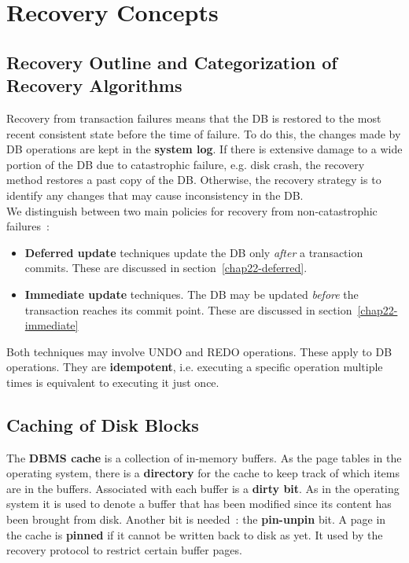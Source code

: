 \section{Recovery Concepts}

\subsection{Recovery Outline and Categorization of Recovery Algorithms}

Recovery from transaction failures means that the DB is restored to the most recent consistent state before the time of failure. To do this, the changes made by DB operations are kept in the \textbf{system log}. If there is extensive damage to a wide portion of the DB due to catastrophic failure, e.g. disk crash, the recovery method restores a past copy of the DB. Otherwise, the recovery strategy is to identify any changes that may cause inconsistency in the DB. \\

We distinguish between two main policies for recovery from non-catastrophic failures~:
\begin{itemize}
    \item \textbf{Deferred update} techniques update the DB only \textit{after} a transaction commits. These are discussed in section~\ref{chap22-deferred}.
    \item \textbf{Immediate update} techniques. The DB may be updated \textit{before} the transaction reaches its commit point. These are discussed in section~\ref{chap22-immediate}
\end{itemize}

Both techniques may involve UNDO and REDO operations. These apply to DB operations. They are \textbf{idempotent}, i.e. executing a specific operation multiple times is equivalent to executing it just once.

\subsection{Caching of Disk Blocks}
The \textbf{DBMS cache} is a collection of in-memory buffers. As the page tables in the operating system, there is a \textbf{directory} for the cache  to keep track of which items are in the buffers. Associated with each buffer is a \textbf{dirty bit}. As in the operating system it is used to denote a buffer that has been modified since its content has been brought from disk. Another bit is needed~: the \textbf{pin-unpin} bit. A page in the cache is \textbf{pinned} if it cannot be written back to disk as yet. It used by the recovery protocol to restrict certain buffer pages. \\

